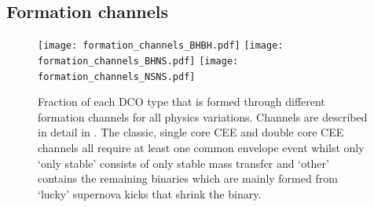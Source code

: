 \clearpage

\subsection{Formation channels}

\begin{figure}[thb]
    \centering
    \texttt{[image: formation\_channels\_BHBH.pdf]}
    \texttt{[image: formation\_channels\_BHNS.pdf]}
    \texttt{[image: formation\_channels\_NSNS.pdf]}
    \caption{Fraction of each DCO type that is formed through different formation channels for all physics variations. Channels are described in detail in \citet{Broekgaarden+2021}. The classic, single core CEE and double core CEE channels all require at least one common envelope event whilst only `only stable' consists of only stable mass transfer and `other' contains the remaining binaries which are mainly formed from `lucky' supernova kicks that shrink the binary. }
    \label{fig:formation_channels}
\end{figure}